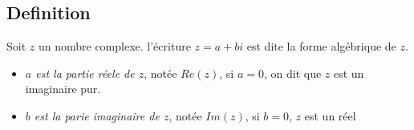 \subsection{Definition}
Soit $z$ un nombre complexe. l'\'ecriture $z=a+bi$ est dite la forme alg\'ebrique de $z$. 
\begin{itemize}
	\item \textit{$a$ est la partie r\'eele de $z$}, not\'ee $Re(z)$, si $a=0$, on dit que $z$ est un imaginaire pur.\\
	\item \textit{$b$ est la parie imaginaire de $z$}, not\'ee $Im(z)$, si $b=0$, $z$ est un r\'eel
\end{itemize}
